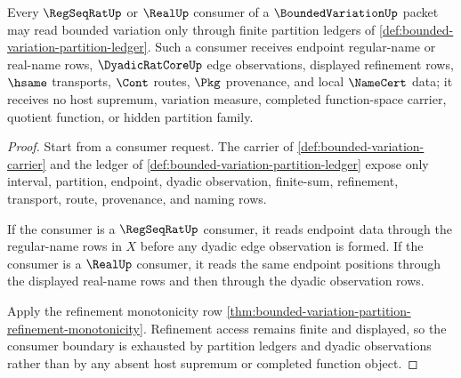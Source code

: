\begin{theorem}
\label{thm:bounded-variation-cauchy-consumer-boundary}
Every $\RegSeqRatUp$ or $\RealUp$ consumer of a $\BoundedVariationUp$ packet may
read bounded variation only through finite partition ledgers of
\autoref{def:bounded-variation-partition-ledger}. Such a consumer receives
endpoint regular-name or real-name rows, $\DyadicRatCoreUp$ edge observations,
displayed refinement rows, $\hsame$ transports, $\Cont$ routes, $\Pkg$
provenance, and local $\NameCert$ data; it receives no host supremum, variation
measure, completed function-space carrier, quotient function, or hidden
partition family.
\end{theorem}
\begin{proof}
Start from a consumer request. The carrier of
\autoref{def:bounded-variation-carrier} and the ledger of
\autoref{def:bounded-variation-partition-ledger} expose only interval,
partition, endpoint, dyadic observation, finite-sum, refinement, transport,
route, provenance, and naming rows.

If the consumer is a $\RegSeqRatUp$ consumer, it reads endpoint data through the
regular-name rows in $X$ before any dyadic edge observation is formed. If the
consumer is a $\RealUp$ consumer, it reads the same endpoint positions through
the displayed real-name rows and then through the dyadic observation rows.

Apply the refinement monotonicity row
\autoref{thm:bounded-variation-partition-refinement-monotonicity}. Refinement
access remains finite and displayed, so the consumer boundary is exhausted by
partition ledgers and dyadic observations rather than by any absent host
supremum or completed function object.
\end{proof}


